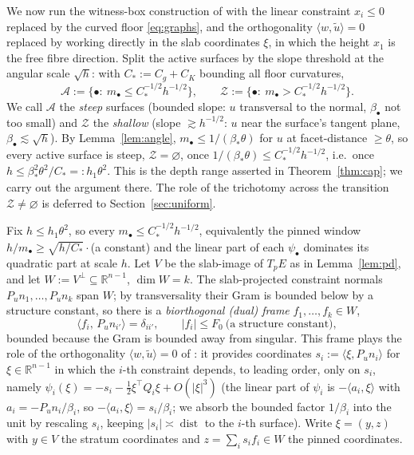 \documentclass[11pt]{article}
\newcommand{\R}{\mathbb{R}}
\newcommand{\dist}{\operatorname{dist}}
\newcommand{\Acal}{\mathcal A}
\newcommand{\Zcal}{\mathcal Z}
\begin{document}
We now run the witness-box construction of \cite{companion11} with the linear
constraint $x_i\le0$ replaced by the curved floor \eqref{eq:graphs}, and the
orthogonality $\langle w,\tilde u\rangle=0$ replaced by working directly in the
slab coordinates $\xi$, in which the height $x_1$ is the free fibre direction.
Split the active surfaces by the slope threshold at the angular scale
$\sqrt h$: with $C_*:=C_g+C_K$ bounding all floor curvatures,
\begin{equation}\label{eq:trichotomy}
\Acal:=\bigl\{\bullet:\ m_\bullet\le C_*^{-1/2}h^{-1/2}\bigr\},
\qquad
\Zcal:=\bigl\{\bullet:\ m_\bullet> C_*^{-1/2}h^{-1/2}\bigr\}.
\end{equation}
We call $\Acal$ the \emph{steep} surfaces (bounded slope: $u$ transversal to the
normal, $\beta_\bullet$ not too small) and $\Zcal$ the \emph{shallow}
(slope $\gtrsim h^{-1/2}$: $u$ near the surface's tangent plane,
$\beta_\bullet\lesssim\sqrt h$).  By Lemma~\ref{lem:angle},
$m_\bullet\le1/(\beta_*\theta)$ for $u$ at facet-distance $\ge\theta$, so every
active surface is steep, $\Zcal=\varnothing$, once
$1/(\beta_*\theta)\le C_*^{-1/2}h^{-1/2}$, i.e.\ once
$h\le\beta_*^2\theta^2/C_*=:h_1\theta^2$.  This is the depth range asserted in
Theorem~\ref{thm:cap}; we carry out the argument there.  The role of the
trichotomy across the transition $\Zcal\ne\varnothing$ is deferred to
Section~\ref{sec:uniform}.

Fix $h\le h_1\theta^2$, so every $m_\bullet\le C_*^{-1/2}h^{-1/2}$, equivalently
the pinned window $h/m_\bullet\ge\sqrt{h/C_*}\cdot$(a constant) and the linear
part of each $\psi_\bullet$ dominates its quadratic part at scale $h$.  Let $V$
be the slab-image of $T_pE$ as in Lemma~\ref{lem:pd}, and let
$W:=V^\perp\subseteq\R^{n-1}$, $\dim W=k$.  The slab-projected constraint normals
$P_u n_1,\dots,P_u n_k$ span $W$; by transversality their Gram is bounded below
by a structure constant, so there is a \emph{biorthogonal (dual) frame}
$f_1,\dots,f_k\in W$,
\begin{equation}\label{eq:dual}
\langle f_i,\,P_u n_{i'}\rangle=\delta_{ii'},
\qquad |f_i|\le F_0\ \text{(a structure constant)},
\end{equation}
bounded because the Gram is bounded away from singular.  This frame plays the
role of the orthogonality $\langle w,\tilde u\rangle=0$ of \cite{companion11}: it
provides coordinates $s_i:=\langle\xi,P_u n_i\rangle$ for $\xi\in\R^{n-1}$ in
which the $i$-th constraint depends, to leading order, only on $s_i$, namely
$\psi_i(\xi)=-s_i-\frac12\xi^\top Q_i\xi+O(|\xi|^3)$ (the linear part of
$\psi_i$ is $-\langle a_i,\xi\rangle$ with $a_i=-P_u n_i/\beta_i$, so
$-\langle a_i,\xi\rangle=s_i/\beta_i$; we absorb the bounded factor $1/\beta_i$
into the unit by rescaling $s_i$, keeping $|s_i|\asymp\dist$ to the $i$-th
surface).  Write $\xi=(y,z)$ with $y\in V$ the stratum coordinates and
$z=\sum_i s_i f_i\in W$ the pinned coordinates.
\end{document}
